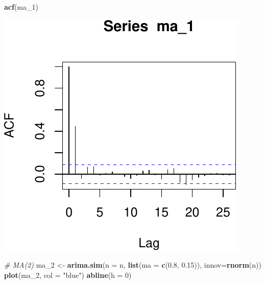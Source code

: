 \documentclass[11pt,]{article}
\newenvironment{Shaded}{\begin{snugshade}}{\end{snugshade}}
\newcommand{\KeywordTok}[1]{\textcolor[rgb]{0.13,0.29,0.53}{\textbf{#1}}}
\newcommand{\DataTypeTok}[1]{\textcolor[rgb]{0.13,0.29,0.53}{#1}}
\newcommand{\DecValTok}[1]{\textcolor[rgb]{0.00,0.00,0.81}{#1}}
\newcommand{\FloatTok}[1]{\textcolor[rgb]{0.00,0.00,0.81}{#1}}
\newcommand{\StringTok}[1]{\textcolor[rgb]{0.31,0.60,0.02}{#1}}
\newcommand{\CommentTok}[1]{\textcolor[rgb]{0.56,0.35,0.01}{\textit{#1}}}
\newcommand{\NormalTok}[1]{#1}
\begin{document}
\begin{Shaded}
\begin{Highlighting}[]
\KeywordTok{acf}\NormalTok{(ma_}\DecValTok{1}\NormalTok{)}
\end{Highlighting}
\end{Shaded}

\begin{center}\includegraphics{FMC_T4_PhD_ARMA_GARCH_files/figure-latex/MA-3} \end{center}

\begin{Shaded}
\begin{Highlighting}[]
\CommentTok{# MA(2)}
\NormalTok{ma_}\DecValTok{2}\NormalTok{ <-}\StringTok{ }\KeywordTok{arima.sim}\NormalTok{(}\DataTypeTok{n =}\NormalTok{ n, }\KeywordTok{list}\NormalTok{(}\DataTypeTok{ma =} \KeywordTok{c}\NormalTok{(}\FloatTok{0.8}\NormalTok{, }\FloatTok{0.15}\NormalTok{)), }\DataTypeTok{innov=}\KeywordTok{rnorm}\NormalTok{(n))}
\KeywordTok{plot}\NormalTok{(ma_}\DecValTok{2}\NormalTok{, }\DataTypeTok{col =} \StringTok{"blue"}\NormalTok{)}
\KeywordTok{abline}\NormalTok{(}\DataTypeTok{h =} \DecValTok{0}\NormalTok{)}
\end{Highlighting}
\end{Shaded}
\end{document}
